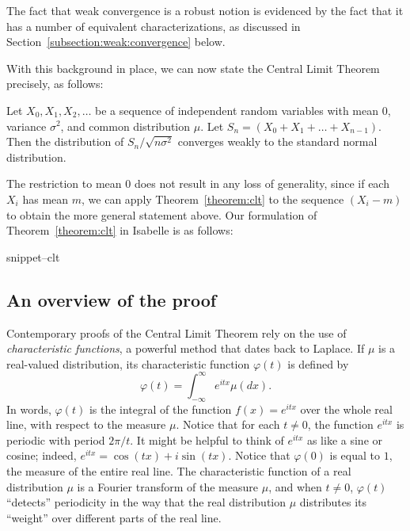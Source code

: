 \documentclass{svjour3}
\newcommand{\ph}{\varphi}
\newcommand{\Snippet}[1]{\csname snippet--#1\endcsname}
\begin{document}
The fact that weak convergence is a robust notion is evidenced by the fact that it has a number of equivalent characterizations, as discussed in Section~\ref{subsection:weak:convergence} below.

With this background in place, we can now state the Central Limit Theorem precisely, as follows:
\begin{theorem}
\label{theorem:clt}
Let $X_0, X_1, X_2, \ldots$ be a sequence of independent random variables with mean $0$, variance $\sigma^2$, and common distribution $\mu$. Let $S_n = (X_0 + X_1 + \ldots + X_{n-1})$. Then the distribution of $S_n / \sqrt{n \sigma^2}$ converges weakly to the standard normal distribution.
\end{theorem}
The restriction to mean $0$ does not result in any loss of generality, since if each $X_i$ has mean $m$, we can apply Theorem~\ref{theorem:clt} to the sequence $(X_i - m)$ to obtain the more general statement above. Our formulation of Theorem~\ref{theorem:clt} in Isabelle is as follows:

\Snippet{clt}

\subsection{An overview of the proof}
\label{subsection:overview}

Contemporary proofs of the Central Limit Theorem rely on the use of \emph{characteristic functions}, a powerful method that dates back to Laplace. If $\mu$ is a real-valued distribution, its characteristic function $\ph(t)$ is defined by
\[
\ph(t) = \int_{-\infty}^{\infty} e^{itx} \mu(dx).
\]
In words, $\ph(t)$ is the integral of the function $f(x) = e^{itx}$ over the whole real line, with respect to the measure $\mu$. Notice that for each $t \neq 0$, the function $e^{itx}$ is periodic with period $2 \pi / t$. It might be helpful to think of $e^{itx}$ as like a sine or cosine; indeed, $e^{itx}= \cos (t x) + i \sin (t x)$. Notice that $\ph(0)$ is equal to $1$, the measure of the entire real line. The characteristic function of a real distribution $\mu$ is a Fourier transform of the measure $\mu$, and when $t \neq 0$, $\ph(t)$ ``detects'' periodicity in the way that the real distribution $\mu$ distributes its ``weight'' over different parts of the real line.
\end{document}
